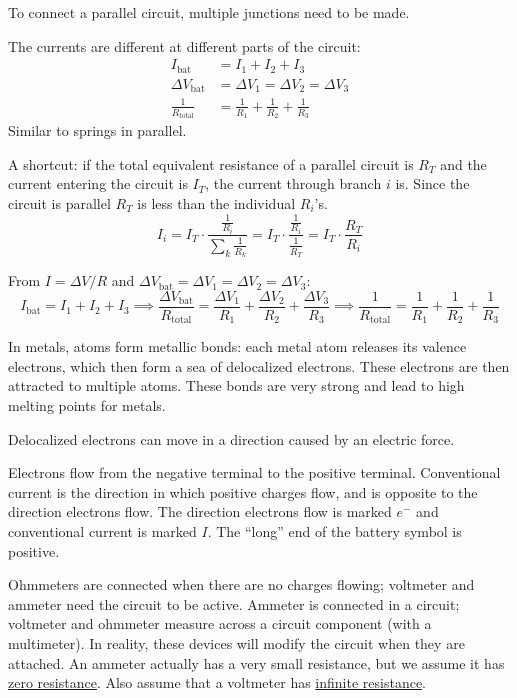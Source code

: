 \documentclass{article}
\newcommand{\theorem}[2]{\begin{tcolorbox}[title={#1},colback=blue!5!white,colframe=blue!75!black,parbox=false] #2 \end{tcolorbox}}
\newcommand{\remark}[2]{\begin{tcolorbox}[title={#1},colback=black!5!white,colframe=black!75!black,parbox=false] #2 \end{tcolorbox}}
\begin{document}
To connect a parallel circuit, multiple junctions need to be made. 

\theorem{Resistors in parallel}{
	The currents are different at different parts of the circuit:
	\begin{align*}
		I_\text{bat}&=I_1+I_2+I_3 \\
		\Delta V_\text{bat}&=\Delta V_1=\Delta V_2=\Delta V_3 \\
		\frac{1}{R_\text{total}}&=\frac{1}{R_1}+\frac{1}{R_2}+\frac{1}{R_3}
	\end{align*}
	Similar to springs in parallel.

	A shortcut: if the total equivalent resistance of a parallel circuit is $R_T$ and the current entering the circuit is $I_T$, the current through branch $i$ is. Since the circuit is parallel $R_T$ is less than the individual $R_i$'s.
	\begin{equation*}
	    I_i
		=I_T\cdot \frac{\frac{1}{R_i}}{\sum_k \frac{1}{R_k}}
		=I_T\cdot \frac{\frac{1}{R_i}}{\frac{1}{R_T}}
		=I_T\cdot \frac{R_T}{R_i}
	\end{equation*}
}
From $I=\Delta V/R$ and $\Delta V_\text{bat}=\Delta V_1=\Delta V_2=\Delta V_3$:
\begin{equation*}
	I_\text{bat}=I_1+I_2+I_3
	\implies \frac{\Delta V_\text{bat}}{R_\text{total}}=\frac{\Delta V_1}{R_1}+\frac{\Delta V_2}{R_2}+\frac{\Delta V_3}{R_3}
	\implies \boxed{\frac{1}{R_\text{total}}=\frac{1}{R_1}+\frac{1}{R_2}+\frac{1}{R_3}}
\end{equation*}

\remark{Electron Sea Model}{
	In metals, atoms form metallic bonds: each metal atom releases its valence electrons, which then form a sea of delocalized electrons. These electrons are then attracted to multiple atoms. These bonds are very strong and lead to high melting points for metals.

	Delocalized electrons can move in a direction caused by an electric force.
}

Electrons flow from the negative terminal to the positive terminal. Conventional current is the direction in which positive charges flow, and is opposite to the direction electrons flow. The direction electrons flow is marked $e^-$ and conventional current is marked $I$. The ``long'' end of the battery symbol is positive.

Ohmmeters are connected when there are no charges flowing; voltmeter and ammeter need the circuit to be active. Ammeter is connected in a circuit; voltmeter and ohmmeter measure across a circuit component (with a multimeter). In reality, these devices will modify the circuit when they are attached. An ammeter actually has a very small resistance, but we assume it has \ul{zero resistance}. Also assume that a voltmeter has \ul{infinite resistance}.
\end{document}
